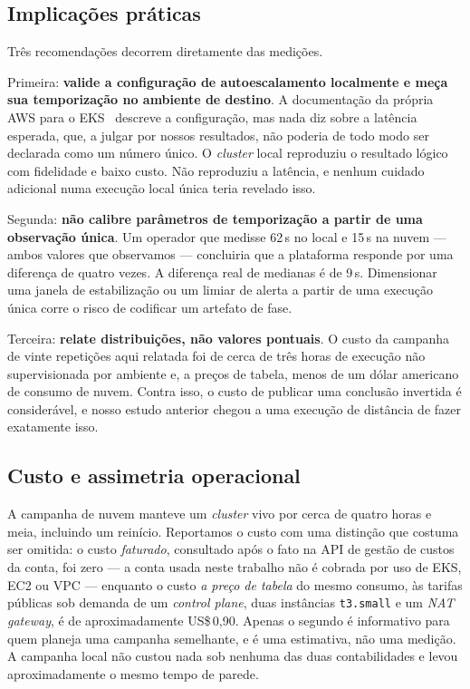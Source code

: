 \documentclass[conference]{IEEEtran}
\begin{document}
\subsection{Implicações práticas}

Três recomendações decorrem diretamente das medições.

Primeira: \textbf{valide a configuração de autoescalamento localmente e meça sua
temporização no ambiente de destino}. A documentação da própria AWS para o
EKS~\cite{awshpa} descreve a configuração, mas nada diz sobre a latência
esperada, que, a julgar por nossos resultados, não poderia de todo modo ser
declarada como um número único. O \emph{cluster} local reproduziu o resultado
lógico com fidelidade e baixo custo. Não reproduziu a latência, e nenhum cuidado
adicional numa execução local única teria revelado isso.

Segunda: \textbf{não calibre parâmetros de temporização a partir de uma
observação única}. Um operador que medisse 62\,s no local e 15\,s na nuvem ---
ambos valores que observamos --- concluiria que a plataforma responde por uma
diferença de quatro vezes. A diferença real de medianas é de 9\,s. Dimensionar
uma janela de estabilização ou um limiar de alerta a partir de uma execução única
corre o risco de codificar um artefato de fase.

Terceira: \textbf{relate distribuições, não valores pontuais}. O custo da
campanha de vinte repetições aqui relatada foi de cerca de três horas de execução
não supervisionada por ambiente e, a preços de tabela, menos de um dólar
americano de consumo de nuvem. Contra isso, o custo de publicar uma conclusão
invertida é considerável, e nosso estudo anterior chegou a uma execução de
distância de fazer exatamente isso.

\subsection{Custo e assimetria operacional}

A campanha de nuvem manteve um \emph{cluster} vivo por cerca de quatro horas e
meia, incluindo um reinício. Reportamos o custo com uma distinção que costuma ser
omitida: o custo \emph{faturado}, consultado após o fato na API de gestão de
custos da conta, foi zero --- a conta usada neste trabalho não é cobrada por uso
de EKS, EC2 ou VPC --- enquanto o custo \emph{a preço de tabela} do mesmo
consumo, às tarifas públicas sob demanda de um \emph{control plane}, duas
instâncias \texttt{t3.small} e um \emph{NAT gateway}, é de aproximadamente
US\$\,0,90. Apenas o segundo é informativo para quem planeja uma campanha
semelhante, e é uma estimativa, não uma medição. A campanha local não custou nada
sob nenhuma das duas contabilidades e levou aproximadamente o mesmo tempo de
parede.
\end{document}
